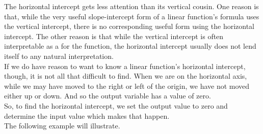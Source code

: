 The horizontal intercept gets less attention than its vertical cousin. One reason is that, while the very useful slope-intercept form of a linear function’s formula uses the vertical intercept, there is no corresponding useful form using the horizontal intercept. The other reason is that while the vertical intercept is often interpretable as a  for the function, the horizontal intercept usually does not lend itself to any natural interpretation.\\

If we do have reason to want to know a linear function’s horizontal intercept, though, it is not all that difficult to find. When we are on the horizontal axis, while we may have moved to the right or left of the origin, we have not moved either up or down. And so the output variable has a value of zero.\\

So, to find the horizontal intercept, we set the output value to zero and determine the input value which makes that happen.\\

The following example will illustrate.



\bigskip

